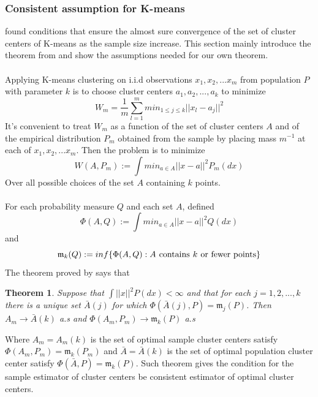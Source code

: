 \documentclass[11pt]{article}
\newtheorem{theorem}{Theorem}
\begin{document}
\subsubsection{Consistent assumption for K-means}
\cite{pollard1981strong} found conditions that ensure the almost sure convergence of the set of cluster centers of K-means as the sample size increase. This section mainly introduce the theorem from \cite{pollard1981strong} and show the assumptions needed for our own theorem.\\\\  
Applying K-means clustering on i.i.d observations $x_1,x_2,...x_m$ from population $P$ with parameter $k$ is to choose cluster centers $a_1,a_2,...,a_k$ to minimize
\[	W_m = \frac{1}{m}\sum^m_{l=1}min_{1\leq j \leq k}||x_l-a_j||^2	\]
It's convenient to treat $W_m$ as a function of the set of cluster centers $A$ and of the  empirical distribution $P_m$ obtained from the sample by placing mass $m^{-1}$ at each of $x_1,x_2,...x_m$. Then the problem is to minimize 
\[ W(A,P_m):=\int min_{a\in A}||x-a||^2P_m(dx)\]
Over all possible choices of the set $A$ containing $k$ points. \\\\
For each probability measure $Q$ and each set $A$, defined
\[	\Phi(A,Q):= \int min_{a\in A}||x-a||^2 Q(dx)	\] and \[ \mathfrak{m}_k(Q):=inf\{\Phi(A,Q):A \hspace{0.05in} \text{contains} \hspace{0.05in} k  \hspace{0.05in} \text{or fewer points}\} \]
The theorem proved by \cite{pollard1981strong} says that
\begin{theorem}
	Suppose that $\int ||x||^2P(dx) < \infty$ and that for each $j=1,2,...,k$ there is a unique set $\bar{A}(j)$ for which $\Phi(\bar{A}(j),P)=\mathfrak{m}_j(P)$. Then $A_m \to \bar{A}(k)$ a.s and $\Phi(A_m,P_m) \to \mathfrak{m}_k(P)$ a.s 
\end{theorem}
\noindent
Where $A_m = A_m(k)$ is the set of optimal sample cluster centers satisfy $\Phi(A_m,P_m) = \mathfrak{m}_k(P_m)$ and $\bar{A}=\bar{A}(k)$ is the set of optimal population cluster center satisfy  $\Phi(\bar{A},P) = \mathfrak{m}_k(P)$. Such theorem gives the condition for the sample estimator of cluster centers be consistent estimator of optimal cluster centers.\\
\end{document}
